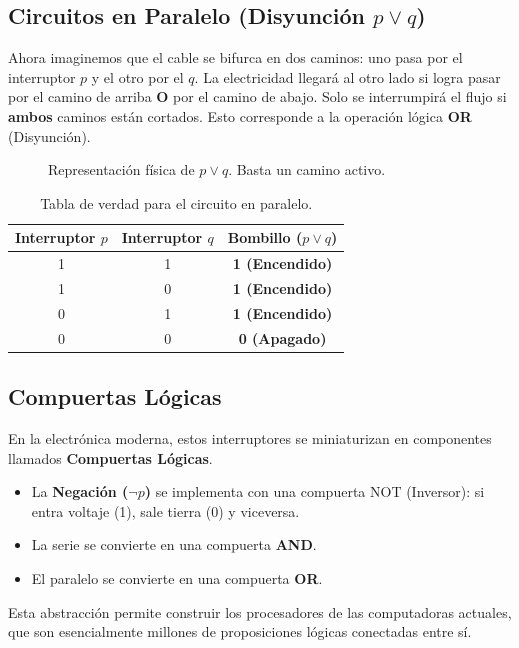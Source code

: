 \subsection{Circuitos en Paralelo (Disyunción $p \lor q$)}

Ahora imaginemos que el cable se bifurca en dos caminos: uno pasa por el interruptor $p$ y el otro por el $q$. La electricidad llegará al otro lado si logra pasar por el camino de arriba \textbf{O} por el camino de abajo. Solo se interrumpirá el flujo si \textbf{ambos} caminos están cortados. Esto corresponde a la operación lógica \textbf{OR} (Disyunción).

\begin{figure}[ht]
\centering
{}
\caption{Representación física de $p \lor q$. Basta un camino activo.}\label{fig:paralelo}
\end{figure}

\begin{table}[ht]
\centering
\begin{tabular}{|c|c||c|}
\hline
\textbf{Interruptor $p$} & \textbf{Interruptor $q$} & \textbf{Bombillo ($p \lor q$)} \\ \hline
1 & 1 & \textbf{1 (Encendido)} \\ \hline
1 & 0 & \textbf{1 (Encendido)} \\ \hline
0 & 1 & \textbf{1 (Encendido)} \\ \hline
0 & 0 & \textbf{0 (Apagado)} \\ \hline
\end{tabular}
\caption{Tabla de verdad para el circuito en paralelo.}
\end{table}

\subsection{Compuertas Lógicas}

En la electrónica moderna, estos interruptores se miniaturizan en componentes llamados \textbf{Compuertas Lógicas}. 
\begin{itemize}
    \item La \textbf{Negación ($\neg p$)} se implementa con una compuerta NOT (Inversor): si entra voltaje (1), sale tierra (0) y viceversa.
    \item La serie se convierte en una compuerta \textbf{AND}.
    \item El paralelo se convierte en una compuerta \textbf{OR}.
\end{itemize}

Esta abstracción permite construir los procesadores de las computadoras actuales, que son esencialmente millones de proposiciones lógicas conectadas entre sí.
